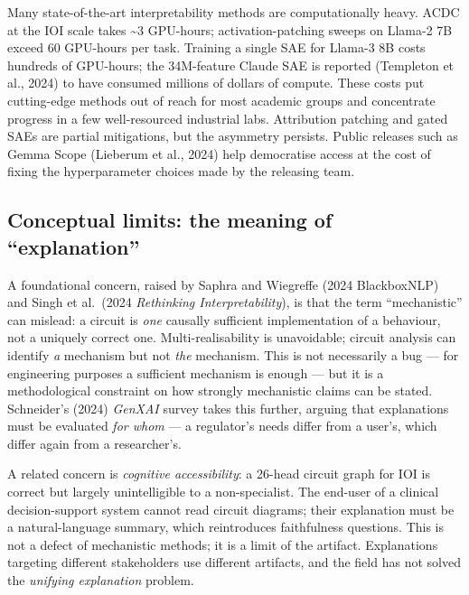 \documentclass{article}
\begin{document}
Many state-of-the-art interpretability methods are computationally heavy. ACDC at the IOI scale takes \textasciitilde3 GPU-hours; activation-patching sweeps on Llama-2 7B exceed 60 GPU-hours per task. Training a single SAE for Llama-3 8B costs hundreds of GPU-hours; the 34M-feature Claude SAE is reported (Templeton et al., 2024) to have consumed millions of dollars of compute. These costs put cutting-edge methods out of reach for most academic groups and concentrate progress in a few well-resourced industrial labs. Attribution patching \citep{syed2024attributionpatchin} and gated SAEs \citep{rajamanoharan2024improvingdictionar} are partial mitigations, but the asymmetry persists. Public releases such as Gemma Scope (Lieberum et al., 2024) help democratise access at the cost of fixing the hyperparameter choices made by the releasing team.

\subsection{Conceptual limits: the meaning of ``explanation''}\label{conceptual-limits-the-meaning-of-explanation}

A foundational concern, raised by Saphra and Wiegreffe (2024 BlackboxNLP) and Singh et al.~(2024 \emph{Rethinking Interpretability}), is that the term ``mechanistic'' can mislead: a circuit is \emph{one} causally sufficient implementation of a behaviour, not a uniquely correct one. Multi-realisability is unavoidable; circuit analysis can identify \emph{a} mechanism but not \emph{the} mechanism. This is not necessarily a bug --- for engineering purposes a sufficient mechanism is enough --- but it is a methodological constraint on how strongly mechanistic claims can be stated. Schneider's (2024) \emph{GenXAI} survey takes this further, arguing that explanations must be evaluated \emph{for whom} --- a regulator's needs differ from a user's, which differ again from a researcher's.

A related concern is \emph{cognitive accessibility}: a 26-head circuit graph for IOI is correct but largely unintelligible to a non-specialist. The end-user of a clinical decision-support system cannot read circuit diagrams; their explanation must be a natural-language summary, which reintroduces faithfulness questions. This is not a defect of mechanistic methods; it is a limit of the artifact. Explanations targeting different stakeholders use different artifacts, and the field has not solved the \emph{unifying explanation} problem.
\end{document}
